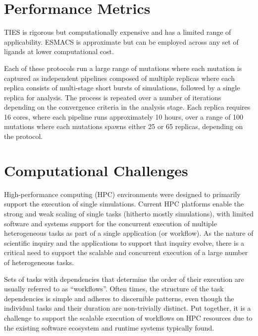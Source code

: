 \documentclass[conference]{IEEEtran}
\begin{document}
\section{Performance Metrics}\label{sec:performance}

TIES is rigorous but computationally expensive and has a limited range of
applicability. ESMACS is approximate but can be employed across any set of
ligands at lower computational cost.

Each of these protocols run a large range of mutations where each
mutation is captured as independent pipelines composed of multiple replicas
where each replica consists of multi-stage short bursts
of simulations, followed by a single replica for analysis. The process is
repeated over a number of iterations depending on the convergence criteria
in the analysis stage. Each replica requires 16 cores, where each pipeline
runs approximately 10 hours, over a range of 100 mutations where each mutations
spawns either 25 or 65 replicas, depending on the protocol.


\section{Computational Challenges}\label{sec:cc}



High-performance computing (HPC) environments were designed to primarily
support the execution of single simulations. Current HPC platforms enable the
strong and weak scaling of single tasks (hitherto mostly simulations), with
limited software and systems support for the concurrent execution of multiple
heterogeneous tasks as part of a single application (or workflow). As the
nature of scientific inquiry and the applications to support that inquiry
evolve, there is a critical need to support the scalable and concurrent
execution of a large number of heterogeneous tasks.

Sets of tasks with dependencies that determine the order of their execution
are usually referred to as ``workflows''. Often times, the structure of the
task dependencies is simple and adheres to discernible patterns, even though
the individual tasks and their duration are non-trivially distinct. Put
together, it is a challenge to support the scalable execution of workflows on
HPC resources due to the existing software ecosystem and runtime systems
typically found.
\end{document}

